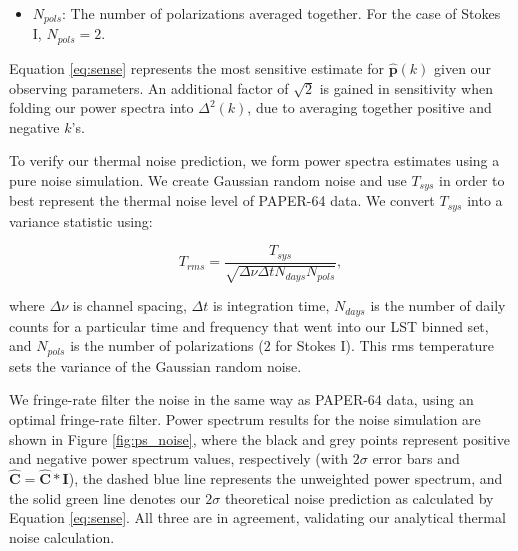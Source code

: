 \documentclass[preprint2,numberedappendix,tighten]{aastex6}  %
\begin{document}
\begin{itemize}
\item $N_{pols}$: The number of polarizations averaged together. For the case of Stokes I, $N_{pols}=2$.
\end{itemize}

Equation \ref{eq:sense} represents the most sensitive estimate for $\hat{\textbf{p}}(k)$ given our observing parameters. An additional factor of $\sqrt{2}$ is gained in sensitivity when folding our power spectra into $\Delta^{2}(k)$, due to averaging together positive and negative $k$'s. 

To verify our thermal noise prediction, we form power spectra estimates using a pure noise simulation. We create Gaussian random noise and use $T_{sys}$ in order to best represent the thermal noise level of PAPER-64 data. We convert $T_{sys}$ into a variance statistic using:

\begin{equation}
T_{rms} = \frac{T_{sys}}{\sqrt{\Delta\nu \Delta t N_{days} N_{pols}}},
\end{equation}

where $\Delta\nu$ is channel spacing, $\Delta t$ is integration time, $N_{days}$ is the number of daily counts for a particular time and frequency that went into our LST binned set, and $N_{pols}$ is the number of polarizations ($2$ for Stokes I). This rms temperature sets the variance of the Gaussian random noise.

We fringe-rate filter the noise in the same way as PAPER-64 data, using an optimal fringe-rate filter. Power spectrum results for the noise simulation are shown in Figure \ref{fig:ps_noise}, where the black and grey points represent positive and negative power spectrum values, respectively (with $2\sigma$ error bars and $\hat{\textbf{C}} = \hat{\textbf{C}} * \textbf{I}$), the dashed blue line represents the unweighted power spectrum, and the solid green line denotes our $2\sigma$ theoretical noise prediction as calculated by Equation \ref{eq:sense}. All three are in agreement, validating our analytical thermal noise calculation. 
\end{document}
